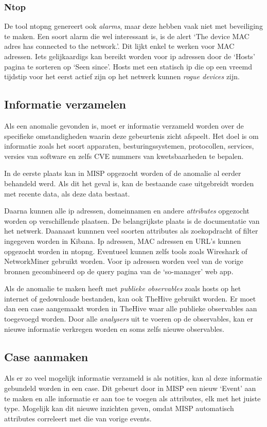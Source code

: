 \documentclass[a4paper,12pt]{report}
\begin{document}
\subsubsection{Ntop}
De tool ntopng genereert ook \emph{alarms}, maar deze hebben vaak niet met beveiliging te maken.
Een soort alarm die wel interessant is, is de alert `The device {MAC adres} has connected to the network.'.
Dit lijkt enkel te werken voor MAC adressen.
Iets gelijkaardigs kan bereikt worden voor ip adressen door de `Hosts' pagina te sorteren op `Seen since'.
Hosts met een statisch ip die op een vreemd tijdstip voor het eerst actief zijn op het netwerk kunnen \emph{rogue devices} zijn.

\subsection{Informatie verzamelen}
Als een anomalie gevonden is, moet er informatie verzameld worden over de specifieke omstandigheden waarin deze gebeurtenis zicht afspeelt.
Het doel is om informatie zoals het soort apparaten, besturingssystemen, protocollen, services, versies van software en zelfs CVE nummers van kwetsbaarheden te bepalen.

In de eerste plaats kan in MISP opgezocht worden of de anomalie al eerder behandeld werd.
Als dit het geval is, kan de bestaande case uitgebreidt worden met recente data, als deze data bestaat.

Daarna kunnen alle ip adressen, domeinnamen en andere \emph{attributes} opgezocht worden op verschillende plaatsen.
De belangrijkste plaats is de documentatie van het netwerk.
Daanaast kunnnen veel soorten attributes als zoekopdracht of filter ingegeven worden in Kibana.
Ip adressen, MAC adressen en URL's kunnen opgezocht worden in ntopng.
Eventueel kunnen zelfs tools zoals Wireshark of NetworkMiner gebruikt worden.
Voor ip adressen worden veel van de vorige bronnen gecombineerd op de query pagina van de `so-manager' web app.

Als de anomalie te maken heeft met \emph{publieke observables} zoals hosts op het internet of gedownloade bestanden, kan ook TheHive gebruikt worden.
Er moet dan een case aangemaakt worden in TheHive waar alle publieke observables aan toegevoegd worden.
Door alle \emph{analysers} uit te voeren op de observables, kan er nieuwe informatie verkregen worden en soms zelfs nieuwe observables.

\subsection{Case aanmaken}
Als er zo veel mogelijk informatie verzameld is als notities, kan al deze informatie gebundeld worden in een case.
Dit gebeurt door in MISP een nieuw `Event' aan te maken en alle informatie er aan toe te voegen als attributes, elk met het juiste type.
Mogelijk kan dit nieuwe inzichten geven, omdat MISP automatisch attributes correleert met die van vorige events.
\end{document}
